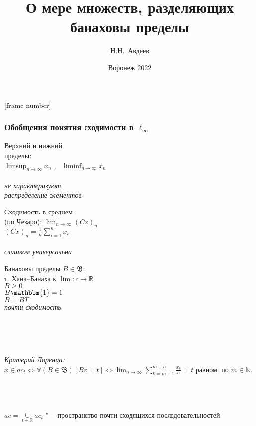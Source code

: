 \documentclass[10pt,pdf,hyperref={unicode},aspectratio=169,color={usenames, dvipsnames}]{beamer}\usepackage{amsmath}
\theoremstyle{definition}
\begin{document}
\title{
	О мере множеств, разделяющих банаховы пределы
}
\author{Н.Н.~Авдеев}
\date{Воронеж 2022}

\maketitle

[frame number]

\begin{frame}\frametitle{Обобщения понятия сходимости в $\ell_\infty$}
	\begin{varwidth}[t]{\linewidth}
		\centering
		Верхний и нижний
		\\
		пределы:
		\\
		$\displaystyle \limsup_{n\to\infty} x_n$
		,~
		$\displaystyle \liminf_{n\to\infty} x_n$
		\\~\\
		\emph{
			не характеризуют
			\\
			распределение элементов
		}
	\end{varwidth}
	\hfill
	\begin{varwidth}[t]{\linewidth}
		\centering
		Сходимость в среднем
		\\
		(по Чезаро):
		$\displaystyle \lim_{n\to\infty} (Cx)_n$
		\\
		$\displaystyle (Cx)_n = \frac1n\sum_{i=1}^n x_i$
		\\~\\
		\emph{слишком универсальна}
	\end{varwidth}
	\hfill
	\begin{varwidth}[t]{\linewidth}
		\centering
		Банаховы пределы $B\in \mathfrak{B}$:
		\\
		т. Хана--Банаха к $\lim: c\to\mathbb R$
		\\
			$B \geqslant 0$
		\\
			$B\mathbbm{1} = 1$
		\\
			$B=BT$
		\\
		\emph{почти сходимость}
	\end{varwidth}
	\\~\\~\\
	\begin{varwidth}[t]{\linewidth}
		\centering
		\emph{Критерий Лоренца:}
		$\displaystyle
			x\in ac_t
			\Leftrightarrow
			\forall(B\in\mathfrak{B})[Bx = t]
			\Leftrightarrow
			\lim_{n\to\infty}  \sum_{k=m+1}^{m+n} \frac{x_k}n = t
		$
		равном. по $m\in\mathbb{N}$.
	\end{varwidth}
	\\~\\
	\vspace{0.8em}
	\begin{varwidth}[t]{\linewidth}
		$\displaystyle ac = \mathop{\cup}\limits_{t\in\mathbb R} ac_t$ "--- пространство почти сходящихся последовательностей
	\end{varwidth}
\end{frame}
\end{document}
